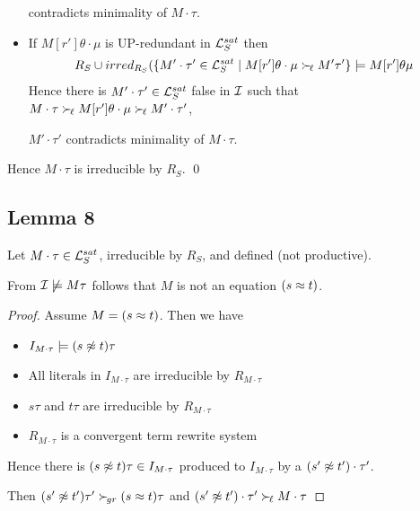 \documentclass[%
handout,
]{beamer}
\begin{document}
\begin{frame}[allowframebreaks]
\begin{itemize}
            contradicts minimality of $M\cdot\tau$.
            \hfill\lightning


            \vspace{0.7em}
            \item If $M[r']\theta\cdot\mu$ is UP-redundant in $\mathcal{L}_S^{sat}$ then
            \begin{gather*}
                R_S \cup irred_{R_S}(
                \{
                    M'\cdot\tau'\in\mathcal{L}_S^{sat}\mid
                    M[r']\theta\cdot\mu \mathrel\succ_{\!\ell} M'\tau'
                    \} \models M[r']\theta\mu
            \end{gather*}
            Hence there is $M'\cdot\tau'\in\mathcal{L}_S^{sat}$ false in $\mathcal{I}$ such that
            $M\cdot\tau\mathrel\succ_{\!\ell} M[r']\theta\cdot\mu\mathrel\succ_{\!\ell} M'\cdot\tau'$,

            $M'\cdot\tau'$ contradicts minimality of $M\cdot\tau$.
            \hfill\lightning

        \end{itemize}

        Hence $M\cdot\tau$ is irreducible by $R_S$.
        \hfill\qed

\end{frame}

\subsection{Lemma 8}
\begin{frame}

    \begin{lemma}\label{equation}
        Let $M\cdot\tau\in\mathcal{L}_S^{sat}$,
        irreducible by $R_S$, and defined (not productive).

        From $\mathcal{I}\not\models M\tau$ follows that $M$ is not an equation $(s\approx t)$.

    \begin{proof}
        Assume $M = (s\approx t)$. Then we have
        \begin{itemize}
            \item $I_{M\cdot\tau}\models (s\not\approx t)\tau$
            \item All literals in $I_{M\cdot\tau}$ are irreducible by $R_{M\cdot\tau}$
            \item $s\tau$ and $t\tau$ are irreducible by $R_{M\cdot\tau}$
            \item $R_{M\cdot\tau}$ is a convergent term rewrite system
        \end{itemize}
        Hence there is $(s\not\approx t)\tau\in I_{M\cdot\tau}$
        produced to $I_{M\cdot\tau}$ by a $(s'\not\approx t')\cdot\tau'$.

        Then $(s'\not\approx t')\tau'\mathrel\succ_{\!gr} (s\approx t)\tau$ and $(s'\not\approx t')\cdot\tau'\mathrel\succ_{\!\ell} M\cdot\tau$
    \end{proof}
    \end{lemma}
\end{frame}
\end{document}
